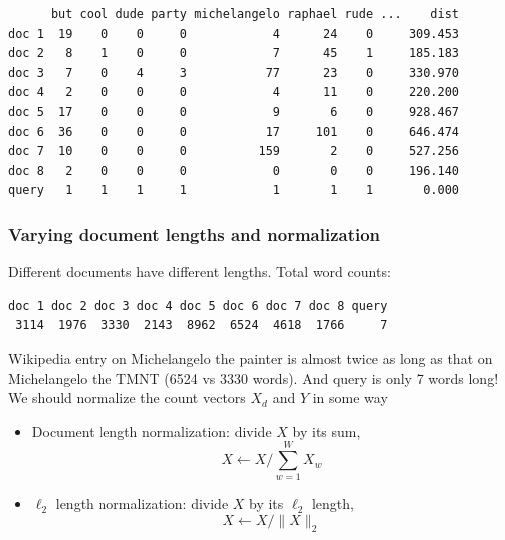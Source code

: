 \documentclass[mathserif]{beamer}
\def\red{\color[rgb]{0.8,0,0}}
\begin{document}
\begin{frame}[fragile]
{\footnotesize
\begin{verbatim}
      but cool dude party michelangelo raphael rude ...    dist
doc 1  19    0    0     0            4      24    0     309.453
doc 2   8    1    0     0            7      45    1     185.183
doc 3   7    0    4     3           77      23    0     330.970
doc 4   2    0    0     0            4      11    0     220.200
doc 5  17    0    0     0            9       6    0     928.467
doc 6  36    0    0     0           17     101    0     646.474
doc 7  10    0    0     0          159       2    0     527.256
doc 8   2    0    0     0            0       0    0     196.140
query   1    1    1     1            1       1    1       0.000
\end{verbatim}}
\end{frame}

\begin{frame}[fragile]
\frametitle{Varying document lengths and normalization}
\smallskip
Different documents have different lengths. Total word counts:

\vspace{-5pt}
{\footnotesize
\begin{verbatim}
doc 1 doc 2 doc 3 doc 4 doc 5 doc 6 doc 7 doc 8 query 
 3114  1976  3330  2143  8962  6524  4618  1766     7 
\end{verbatim}}

\vspace{-5pt}
Wikipedia entry on Michelangelo the painter is almost twice as long
as that on Michelangelo the TMNT (6524 vs 3330 words). 
And query is only 7 words long! We should
{\red normalize} the count vectors $X_d$ and $Y$ in some way

\begin{itemize}
\item {\red Document length} normalization: divide $X$
by its sum,
\vspace{-5pt}
$$X \leftarrow X/\sum_{w=1}^W X_w$$
\item {\red $\ell_2$ length} normalization: divide $X$ 
by its $\ell_2$ length,
\vspace{-5pt}
$$X \leftarrow X / \|X\|_2$$
\end{itemize}

\end{frame}
\end{document}
